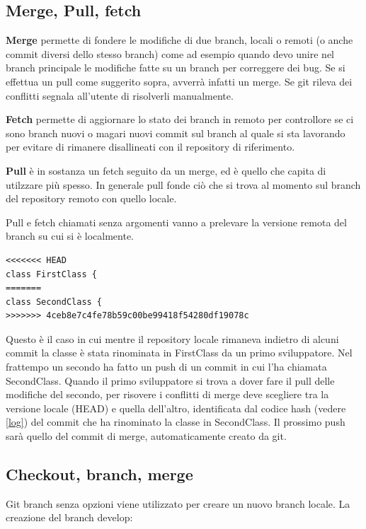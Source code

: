 \documentclass{article} \usepackage[textwidth=19cm,textheight=24cm]{geometry}
\begin{document}
\subsection{Merge, Pull, fetch}

\textbf{Merge} permette di fondere le modifiche di due branch, locali o remoti (o anche
commit diversi dello stesso branch) come ad esempio quando devo unire nel branch principale
le modifiche fatte su un branch per correggere dei bug. Se si effettua un pull come suggerito
sopra, avverrà infatti un merge. Se git rileva dei conflitti segnala all'utente
di risolverli manualmente. 

\textbf{Fetch} permette di aggiornare lo stato dei branch in remoto per controllore
se ci sono branch nuovi o magari nuovi commit sul branch al quale si sta lavorando per evitare
di rimanere disallineati con il repository di riferimento.

\textbf{Pull} è in sostanza un fetch seguito da un merge, ed è quello che capita di
utilzzare più spesso. In generale pull fonde ciò che si trova al momento sul
branch del repository remoto con quello locale.

Pull e fetch chiamati senza argomenti vanno a prelevare la versione remota del
branch su cui si è localmente.

\begin{verbatim}
<<<<<<< HEAD
class FirstClass {
=======
class SecondClass {
>>>>>>> 4ceb8e7c4fe78b59c00be99418f54280df19078c
\end{verbatim}

Questo è il caso in cui mentre il repository locale rimaneva indietro di alcuni
commit la classe è stata rinominata in FirstClass da un primo sviluppatore. Nel
frattempo un secondo ha fatto un push di un commit in cui l'ha chiamata
SecondClass. Quando il primo sviluppatore si trova a dover fare il pull delle modifiche del
secondo, per risovere i conflitti di merge deve scegliere tra la versione locale
(HEAD) e quella dell'altro, identificata dal codice hash (vedere \ref{log}) del commit che ha
rinominato la classe in SecondClass. Il prossimo push sarà quello del commit di
merge, automaticamente creato da git.

\subsection{Checkout, branch, merge}

Git branch senza opzioni viene utilizzato per creare un nuovo branch locale. La
creazione del branch develop:
\end{document}
